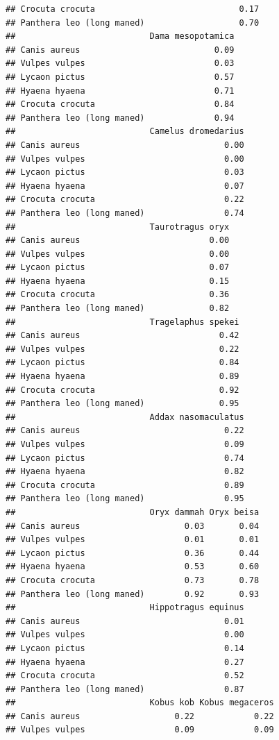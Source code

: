 \documentclass[
]{article}
\begin{document}
\begin{verbatim}
## Crocuta crocuta                             0.17
## Panthera leo (long maned)                   0.70
##                           Dama mesopotamica
## Canis aureus                           0.09
## Vulpes vulpes                          0.03
## Lycaon pictus                          0.57
## Hyaena hyaena                          0.71
## Crocuta crocuta                        0.84
## Panthera leo (long maned)              0.94
##                           Camelus dromedarius
## Canis aureus                             0.00
## Vulpes vulpes                            0.00
## Lycaon pictus                            0.03
## Hyaena hyaena                            0.07
## Crocuta crocuta                          0.22
## Panthera leo (long maned)                0.74
##                           Taurotragus oryx
## Canis aureus                          0.00
## Vulpes vulpes                         0.00
## Lycaon pictus                         0.07
## Hyaena hyaena                         0.15
## Crocuta crocuta                       0.36
## Panthera leo (long maned)             0.82
##                           Tragelaphus spekei
## Canis aureus                            0.42
## Vulpes vulpes                           0.22
## Lycaon pictus                           0.84
## Hyaena hyaena                           0.89
## Crocuta crocuta                         0.92
## Panthera leo (long maned)               0.95
##                           Addax nasomaculatus
## Canis aureus                             0.22
## Vulpes vulpes                            0.09
## Lycaon pictus                            0.74
## Hyaena hyaena                            0.82
## Crocuta crocuta                          0.89
## Panthera leo (long maned)                0.95
##                           Oryx dammah Oryx beisa
## Canis aureus                     0.03       0.04
## Vulpes vulpes                    0.01       0.01
## Lycaon pictus                    0.36       0.44
## Hyaena hyaena                    0.53       0.60
## Crocuta crocuta                  0.73       0.78
## Panthera leo (long maned)        0.92       0.93
##                           Hippotragus equinus
## Canis aureus                             0.01
## Vulpes vulpes                            0.00
## Lycaon pictus                            0.14
## Hyaena hyaena                            0.27
## Crocuta crocuta                          0.52
## Panthera leo (long maned)                0.87
##                           Kobus kob Kobus megaceros
## Canis aureus                   0.22            0.22
## Vulpes vulpes                  0.09            0.09

\end{verbatim}
\end{document}
